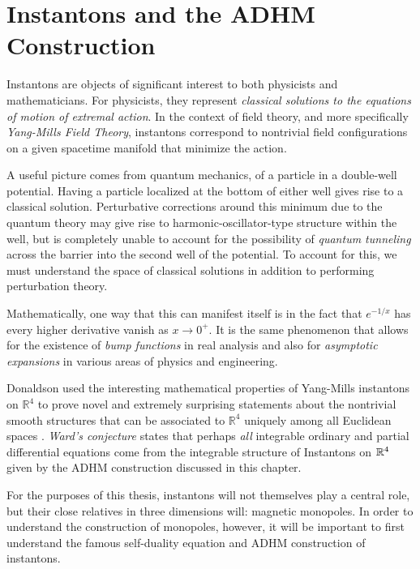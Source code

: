 \chapter{Instantons and the ADHM Construction\label{ch:instantons}}

Instantons are objects of significant interest to both physicists and mathematicians. 
For physicists, they represent \emph{classical solutions to the equations of motion of extremal action}. In the context of field theory, and more specifically \emph{Yang-Mills Field Theory}, instantons correspond to nontrivial field configurations on a given spacetime manifold that minimize the action. 

A useful picture comes from quantum mechanics, of a particle in a double-well potential. Having a particle localized at the bottom of either well gives rise to a classical solution. Perturbative corrections around this minimum due to the quantum theory may give rise to harmonic-oscillator-type structure within the well, but is completely unable to account for the possibility of \emph{quantum tunneling} across the barrier into the second well of the potential. To account for this, we must understand the space of classical solutions in addition to performing perturbation theory. 

Mathematically, one way that this can manifest itself is in the fact that $e^{-1/x}$ has every higher derivative vanish as $x \to 0^+$. It is the same phenomenon that allows for the existence of \emph{bump functions} in real analysis and also for \emph{asymptotic expansions} in various areas of physics and engineering.

Donaldson used the interesting mathematical properties of Yang-Mills instantons on $\mathbb R^4$ to prove novel and extremely surprising statements about the nontrivial smooth structures that can be associated to $\mathbb R^4$ uniquely among all Euclidean spaces \cite{donaldson1984}. \emph{Ward's conjecture} \cite{ward1985} states that perhaps \emph{all} integrable ordinary and partial differential equations come from the integrable structure of Instantons on $\mathbb{R}^4$ given by the ADHM construction discussed in this chapter. 

For the purposes of this thesis, instantons will not themselves play a central role, but their close relatives in three dimensions will: magnetic monopoles. In order to understand the construction of monopoles, however, it will be important to first understand the famous self-duality equation and ADHM construction of instantons. 


